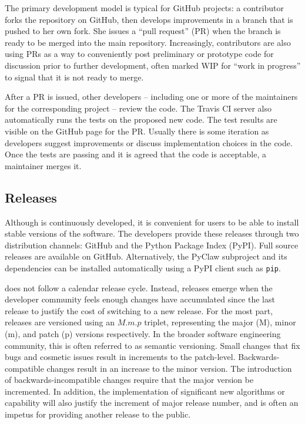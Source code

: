 The primary development model is typical for GitHub projects: a
contributor forks the repository on GitHub, then develops improvements
in a branch that is pushed to her own fork.  She issues a ``pull
request'' (PR) when the branch is ready to be merged into the main
repository.  Increasingly, contributors are also using PRs as a way to
conveniently post preliminary or prototype code for discussion prior
to further development, often marked WIP for ``work in progress'' to signal
that it is not ready to merge.

After a PR is issued, other developers -- including one or more of the
maintainers for the corresponding project -- review the code.  The Travis
CI server also automatically runs the tests on the proposed new code.  The test
results are visible on the GitHub page for the PR.  Usually there is
some iteration as developers suggest improvements or discuss
implementation choices in the code.  Once the tests are passing and it
is agreed that the code is acceptable, a maintainer merges it.

\subsection{Releases}

Although \clawpack is continuously developed, it is convenient for
users to be able to install stable versions of the software.  The
\clawpack developers provide these releases through two distribution
channels: GitHub and the Python Package Index (PyPI).  Full source
releases are available on GitHub.  Alternatively, the PyClaw
subproject and its dependencies can be installed automatically using a
PyPI client such as \texttt{pip}.

\clawpack does not follow a calendar release cycle.  Instead, releases
emerge when the developer community feels enough changes have
accumulated since the last release to justify
the cost of switching to a new release.  For the most part, \clawpack 
releases are
versioned using an $M.m.p$ triplet, representing the major (M), minor (m), and
patch (p) versions respectively.  In the broader software engineering
community, this is often referred to as semantic versioning.  Small
changes that fix bugs and cosmetic issues result in increments to the
patch-level.  Backwards-compatible changes result in an increase to
the minor version.  The introduction of backwards-incompatible changes
require that the major version be incremented.  In addition, the
implementation of significant new algorithms or capability will also
justify the increment of major release number, and is often an impetus
for providing another release to the public.
